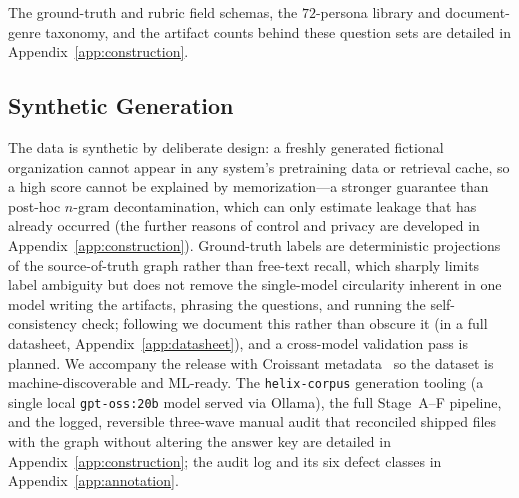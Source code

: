 The ground-truth and rubric field schemas, the $72$-persona library and
document-genre taxonomy, and the artifact counts behind these question sets are
detailed in Appendix~\ref{app:construction}.

\subsection{Synthetic Generation}
\label{sec:design:why-synthetic}
\label{sec:generation}
\label{sec:design:generation}

The data is synthetic by deliberate design: a freshly generated fictional
organization cannot appear in any system's pretraining data or retrieval cache, so
a high score cannot be explained by memorization---a stronger guarantee than
post-hoc $n$-gram decontamination, which can only estimate leakage that has
already occurred (the further reasons of control and privacy are developed in
Appendix~\ref{app:construction}). Ground-truth labels are deterministic
projections of the source-of-truth graph rather than free-text recall, which
sharply limits label ambiguity but does not remove the single-model circularity
inherent in one model writing the artifacts, phrasing the questions, and running
the self-consistency check; following \citet{gebru2021datasheets} we document
this rather than obscure it (in a full datasheet, Appendix~\ref{app:datasheet}),
and a cross-model validation pass is planned. We accompany the release with
Croissant metadata~\citep{croissant2024} so the dataset is machine-discoverable
and ML-ready. The \texttt{helix-corpus} generation tooling (a single local
\texttt{gpt-oss:20b} model served via Ollama), the full Stage~A--F pipeline, and
the logged, reversible three-wave manual audit that reconciled shipped files with
the graph without altering the answer key are detailed in
Appendix~\ref{app:construction}; the audit log and its six defect classes in
Appendix~\ref{app:annotation}.
